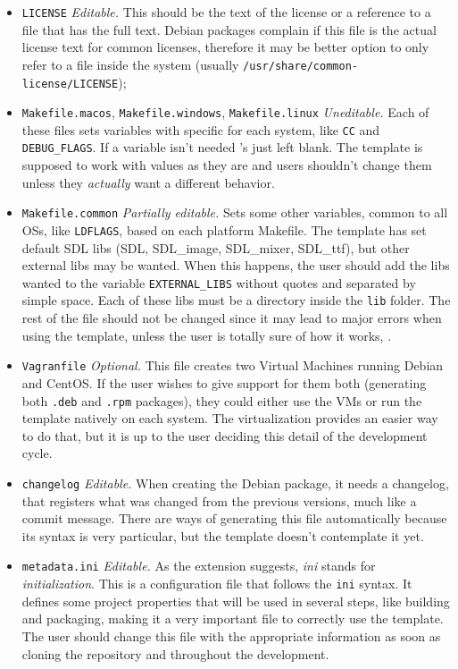 \begin{itemize}
	\item \texttt{LICENSE} \emph{Editable.} This should be the text of the license or a reference to a file that has the full text. Debian packages complain if this file is the actual license text for common licenses, therefore it may be better option to only refer to a file inside the system (usually \texttt{/usr/share/common-license/LICENSE});
	\item \texttt{Makefile.macos}, \texttt{Makefile.windows}, \texttt{Makefile.linux} \emph{Uneditable.} Each of these files sets variables with specific for each system, like \texttt{CC} and \texttt{DEBUG\_FLAGS}. If a variable isn't needed 's just left blank. The template is supposed to work with values as they are and users shouldn't change them unless they \emph{actually} want a different behavior.
	\item \texttt{Makefile.common} \emph{Partially editable.} Sets some other variables, common to all OSs, like \texttt{LDFLAGS}, based on each platform Makefile. The template has set default SDL libs (SDL, SDL\_image, SDL\_mixer, SDL\_ttf), but other external libs may be wanted. When this happens, the user should add the libs wanted to the variable \texttt{EXTERNAL\_LIBS} without quotes and separated by simple space. Each of these libs must be a directory inside the \texttt{lib} folder. The rest of the file should not be changed  since it may lead to major errors when using the template, unless the user is totally sure of how it works, .
	\item \texttt{Vagranfile} \emph{Optional.} This file creates two Virtual Machines running Debian and CentOS. If the user wishes to give support for them both (generating both \texttt{.deb} and \texttt{.rpm} packages), they could either use the VMs or run the template natively on each system. The virtualization provides an easier way to do that, but it is up to the user deciding this detail of the development cycle.
	\item \texttt{changelog} \emph{Editable.} When creating the Debian package, it needs a changelog, that registers what was changed from the previous versions, much like a commit message. There are ways of generating this file automatically because its syntax is very particular, but the template doesn't contemplate it yet.
	\item \texttt{metadata.ini} \emph{Editable.} As the extension suggests, \textit{ini} stands for \textit{initialization}. This is a configuration file that follows the \texttt{ini} syntax. It defines some project properties that will be used in several steps, like building and packaging, making it a very important file to correctly use the template. The user should change this file with the appropriate information as soon as cloning the repository and throughout the development.
\end{itemize}


